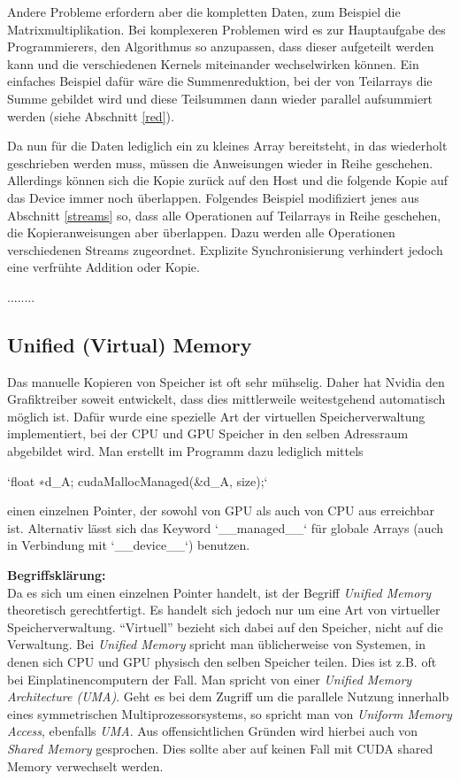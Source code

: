 		Andere Probleme erfordern aber die kompletten Daten, zum Beispiel die Matrixmultiplikation. Bei komplexeren Problemen wird es zur Hauptaufgabe des Programmierers, den Algorithmus so anzupassen, dass dieser aufgeteilt werden kann und die verschiedenen \Glspl{Kernel} miteinander wechselwirken können. Ein einfaches Beispiel dafür wäre die Summenreduktion, bei der von Teilarrays die Summe gebildet wird und diese Teilsummen dann wieder parallel aufsummiert werden (siehe Abschnitt \ref{red}). 
		
		Da nun für die Daten lediglich ein zu kleines Array bereitsteht, in das wiederholt geschrieben werden muss, müssen die Anweisungen wieder in Reihe geschehen. Allerdings können sich die Kopie zurück auf den Host und die folgende Kopie auf das Device immer noch überlappen. Folgendes Beispiel modifiziert jenes aus Abschnitt \ref{streams} so, dass alle Operationen auf Teilarrays in Reihe geschehen, die Kopieranweisungen aber überlappen. Dazu werden alle Operationen verschiedenen \Glspl{Stream} zugeordnet. Explizite Synchronisierung verhindert jedoch eine verfrühte Addition oder Kopie.
		
		........
		
		\subsection*{Unified (Virtual) Memory}
		Das manuelle Kopieren von Speicher ist oft sehr mühselig. Daher hat Nvidia den Grafiktreiber soweit entwickelt, dass dies mittlerweile weitestgehend automatisch möglich ist. Dafür wurde eine spezielle Art der virtuellen Speicherverwaltung implementiert, bei der CPU und GPU Speicher in den selben Adressraum abgebildet wird. 
		Man erstellt im Programm dazu lediglich mittels 
		
		\li`float ∗d_A; cudaMallocManaged(&d_A, size);` 
		
		einen einzelnen Pointer, der sowohl von GPU als auch von CPU aus erreichbar ist. Alternativ lässt sich das Keyword \li`__managed__` für globale Arrays (auch in Verbindung mit \li`__device__`) benutzen.
		
		\textbf{Begriffsklärung:}\\
		Da es sich um einen einzelnen Pointer handelt, ist der Begriff \textit{Unified Memory} theoretisch gerechtfertigt. Es handelt sich jedoch nur um eine Art von virtueller Speicherverwaltung. \enquote{Virtuell} bezieht sich dabei auf den Speicher, nicht auf die Verwaltung. Bei \textit{Unified Memory} spricht man üblicherweise von Systemen, in denen sich CPU und GPU physisch den selben Speicher teilen. Dies ist z.B. oft bei Einplatinencomputern der Fall. Man spricht von einer \textit{Unified Memory Architecture (UMA)}. Geht es bei dem Zugriff um die parallele Nutzung innerhalb eines symmetrischen Multiprozessorsystems, so spricht man von \textit{Uniform Memory Access}, ebenfalls \textit{UMA}. Aus offensichtlichen Gründen wird hierbei auch von \textit{Shared Memory} gesprochen. Dies sollte aber auf keinen Fall mit CUDA \Gls{shared Memory} verwechselt werden.
		
